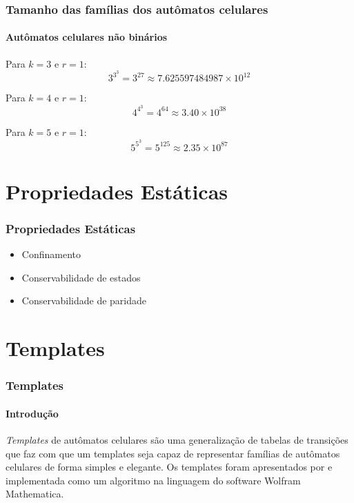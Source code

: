 \documentclass[aspectratio=43]{beamer}
\begin{document}
\begin{frame}
\frametitle{Tamanho das famílias dos autômatos celulares}
\framesubtitle{Autômatos celulares não binários}

Para $k=3$ e $r=1$:
\begin{equation}
3^{3^{3}} = 3^{27} \approx 7.625597484987\times 10^{12}
\end{equation}

Para $k=4$ e $r=1$:
\begin{equation}
4^{4^{3}} = 4^{64} \approx 3.40\times 10^{38}
\end{equation}

Para $k=5$ e $r=1$:
\begin{equation}
5^{5^{3}} = 5^{125} \approx 2.35\times 10^{87}
\end{equation}

\end{frame}

 \section{Propriedades Estáticas}
 \begin{frame}
     \frametitle{Propriedades Estáticas}
     \begin{itemize}
           \item Confinamento
           \item Conservabilidade de estados
           \item Conservabilidade de paridade
     \end{itemize}
 \end{frame}



\section{Templates}
\begin{frame}
	\frametitle{Templates}
	\framesubtitle{Introdução}
	
	\textit{Templates} de autômatos celulares são uma generalização de tabelas de transições que faz com que um templates seja capaz de representar famílias de autômatos celulares de forma simples e elegante. Os templates foram apresentados por  e implementada como um algoritmo na linguagem do software Wolfram Mathematica.

 \end{frame}
\end{document}
